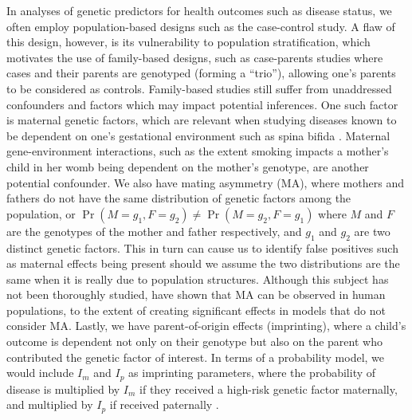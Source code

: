 \documentclass[12pt]{article}
\begin{document}
In analyses of genetic predictors for health outcomes such as disease status, we often employ population-based designs such as the case-control study.  A flaw of this design, however, is its vulnerability to population stratification, which motivates the use of family-based designs, such as case-parents studies where cases and their parents are genotyped (forming a ``trio''), allowing one's parents to be considered as controls.  Family-based studies still suffer from unaddressed confounders and factors which may impact potential inferences.  One such factor is maternal genetic factors, which are relevant when studying diseases known to be dependent on one's gestational environment such as spina bifida \citep{Hobb14}.  Maternal gene-environment interactions, such as the extent smoking impacts a mother's child in her womb being dependent on the mother's genotype, are another potential confounder. We also have mating asymmetry (MA), where mothers and fathers do not have the same distribution of genetic factors among the population, or $\Pr(M=g_1, F=g_2) \not = \Pr(M=g_2, F=g_1)$ where $M$ and $F$ are the genotypes of the mother and father respectively, and $g_1$ and $g_2$ are two distinct genetic factors.  This in turn can cause us to identify false positives such as maternal effects being present should we assume the two distributions are the same when it is really due to population structures.  Although this subject has not been thoroughly studied, \cite{Bour+11} have shown that MA can be observed in human populations, to the extent of creating significant effects in models that do not consider MA.  Lastly, we have parent-of-origin effects (imprinting), where a child's outcome is dependent not only on their genotype but also on the parent who contributed the genetic factor of interest.  In terms of a probability model, we would include $I_m$ and $I_p$ as imprinting parameters, where the probability of disease is multiplied by $I_m$ if they received a high-risk genetic factor maternally, and multiplied by $I_p$ if received paternally \citep{Ains11}.
\end{document}
